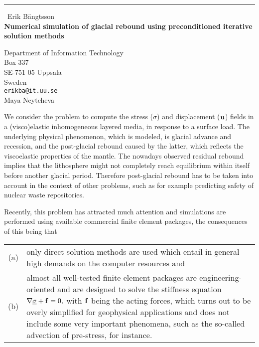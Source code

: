 \documentclass{report}
\begin{document}
\begin{center}
\rule{6in}{1pt} \
{\large Erik B{\"a}ngtsson \\
{\bf Numerical simulation of glacial rebound using preconditioned iterative solution methods}}

Department of Information Technology \\ Box 337 \\ SE-751 05 Uppsala \\ Sweden
\\
{\tt erikba@it.uu.se}\\
Maya Neytcheva\end{center}

We consider the problem to compute the stress ($\sigma$) and
displacement ($\bf{u}$) fields in a (visco)elastic inhomogeneous layered media,
in response to a surface load.
The underlying physical phenomenon, which is modeled, is glacial advance
and recession, and the post-glacial rebound caused by the latter, which
reflects the viscoelastic properties of the mantle. The nowadays observed
residual rebound
implies that the lithosphere might not completely reach equilibrium
within itself before another glacial period.
Therefore post-glacial rebound has to be taken into account
in the context of other problems, such as for example predicting safety
of nuclear waste repositories.

Recently, this problem has attracted much attention
and simulations are performed using available commercial
finite element packages, the consequences of this being that

\begin{tabular}{cp{5.62in}}
(a)&only direct solution methods are used which entail in general high
demands on the computer resources and\\
(b)& almost all well-tested finite element packages are
engineering-oriented and are designed to solve the stiffness equation
$
\nabla\underline{\sigma} + {\bf f} = 0,
$
with ${\bf f}$ being the acting forces,
which turns out to be overly simplified for geophysical applications and
does not include some very important phenomena, such as the so-called
advection
of pre-stress, for instance.
\end{tabular}
\end{document}
